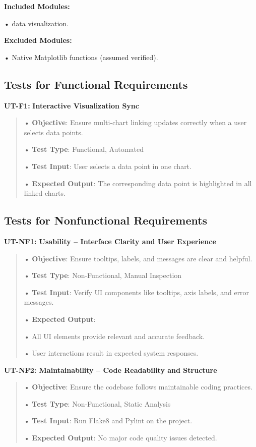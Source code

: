 \documentclass[
]{article}
\begin{document}
\textbf{Included Modules:}

• data visualization.

\textbf{Excluded Modules:}

• Native Matplotlib functions (assumed verified).

\hypertarget{tests-for-functional-requirements-1}{%
\subsection{Tests for Functional
Requirements}\label{tests-for-functional-requirements-1}}

\textbf{UT-F1:} \textbf{Interactive Visualization Sync}

\begin{quote}
• \textbf{Objective}: Ensure multi-chart linking updates correctly when
a user selects data points.

• \textbf{Test Type}: Functional, Automated

• \textbf{Test Input}: User selects a data point in one chart.

• \textbf{Expected Output}: The corresponding data point is highlighted
in all linked charts.
\end{quote}

\hypertarget{tests-for-nonfunctional-requirements-1}{%
\subsection{Tests for Nonfunctional
Requirements}\label{tests-for-nonfunctional-requirements-1}}

\textbf{UT-NF1: Usability -- Interface Clarity and User Experience}

\begin{quote}
• \textbf{Objective}: Ensure tooltips, labels, and messages are clear
and helpful.

• \textbf{Test Type}: Non-Functional, Manual Inspection

• \textbf{Test Input}: Verify UI components like tooltips, axis labels,
and error messages.

• \textbf{Expected Output}:

• All UI elements provide relevant and accurate feedback.

• User interactions result in expected system responses.
\end{quote}

\textbf{UT-NF2: Maintainability -- Code Readability and Structure}

\begin{quote}
• \textbf{Objective}: Ensure the codebase follows maintainable coding
practices.

• \textbf{Test Type}: Non-Functional, Static Analysis

• \textbf{Test Input}: Run Flake8 and Pylint on the project.

• \textbf{Expected Output}: No major code quality issues detected.
\end{quote}
\end{document}
